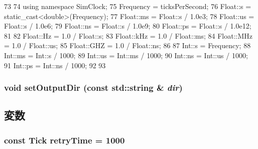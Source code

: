 \begin{DoxyCode}
73 {
74     using namespace SimClock;
75     Frequency = ticksPerSecond;
76     Float::s = static_cast<double>(Frequency);
77     Float::ms = Float::s / 1.0e3;
78     Float::us = Float::s / 1.0e6;
79     Float::ns = Float::s / 1.0e9;
80     Float::ps = Float::s / 1.0e12;
81 
82     Float::Hz  = 1.0 / Float::s;
83     Float::kHz = 1.0 / Float::ms;
84     Float::MHz = 1.0 / Float::us;
85     Float::GHZ = 1.0 / Float::ns;
86 
87     Int::s  = Frequency;
88     Int::ms = Int::s / 1000;
89     Int::us = Int::ms / 1000;
90     Int::ns = Int::us / 1000;
91     Int::ps = Int::ns / 1000;
92 
93 }
\end{DoxyCode}
\hypertarget{core_8hh_afd5c60b871e1d4bea62db33e251fb9fd}{
\subsubsection[{setOutputDir}]{\setlength{\rightskip}{0pt plus 5cm}void setOutputDir (const std::string \& {\em dir})}}
\label{core_8hh_afd5c60b871e1d4bea62db33e251fb9fd}


\subsection{変数}
\hypertarget{core_8hh_aabf2ecba12e5e7712c4926d64bd10b46}{
\subsubsection[{retryTime}]{\setlength{\rightskip}{0pt plus 5cm}const {\bf Tick} {\bf retryTime} = 1000}}
\label{core_8hh_aabf2ecba12e5e7712c4926d64bd10b46}
